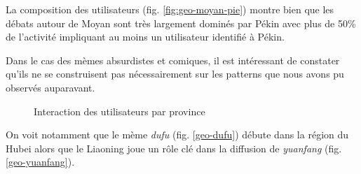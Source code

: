 La composition des utilisateurs (fig. \ref{fig:geo-moyan-pie}) montre bien que les d\'ebats autour de Moyan sont tr\`es largement domin\'es par P\'ekin avec plus de 50\% de l{\textquoteright}activit\'e impliquant au moins un utilisateur identifi\'e \`a P\'ekin.

Dans le cas des m\`emes absurdistes et comiques, il est int\'eressant de constater qu{\textquoteright}ils ne se construisent pas n\'ecessairement sur les patterns que nous avons pu observ\'es auparavant.

\begin{figure}[H]
    \centering
    \caption{
        Interaction des utilisateurs par province
    }

\end{figure}


On voit notamment que le m\`eme \textit{dufu } (fig. \ref{geo-dufu}) d\'ebute dans la r\'egion
du Hubei alors que le Liaoning joue un r\^ole cl\'e dans la diffusion de \textit{yuanfang} (fig. \ref{geo-yuanfang}). 


